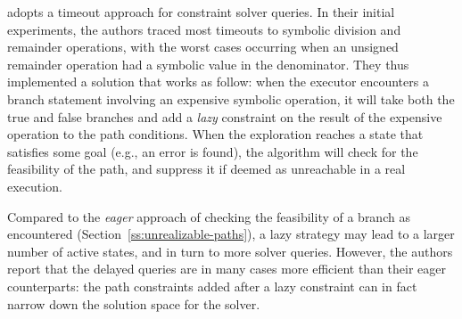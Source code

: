 

\cite{UCKLEE-USEC15} adopts a timeout approach for constraint solver queries. In their initial experiments, the authors traced most timeouts to symbolic division and remainder operations, with the worst cases occurring when an unsigned remainder operation had a symbolic value in the denominator.
They thus implemented a solution that works as follow: when the executor encounters a branch statement involving an expensive symbolic operation, it will take both the true and false branches and add a {\em lazy} constraint on the result of the expensive operation to the path conditions. When the exploration reaches a state that satisfies some goal (e.g., an error is found), the algorithm will check for the feasibility of the path, and suppress it if deemed as unreachable in a real execution.

Compared to the {\em eager} approach of checking the feasibility of a branch as encountered (Section~\ref{ss:unrealizable-paths}), a lazy strategy may lead to a larger number of active states, and in turn to more solver queries. However, the authors report that the delayed queries are in many cases more efficient than their eager counterparts: the path constraints added after a lazy constraint can in fact narrow down the solution space for the solver.


